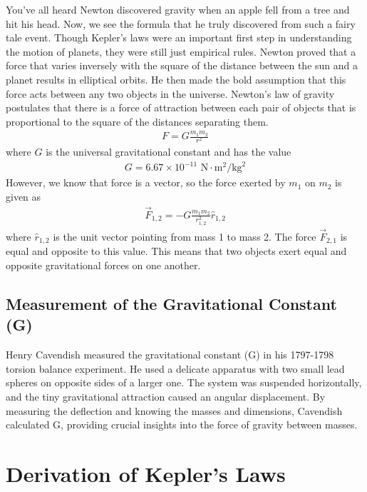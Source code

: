 \documentclass[11pt]{article}
\begin{document}
You've all heard Newton discovered gravity when an apple fell from a tree and hit his head. Now, we see the formula that he truly discovered from such a fairy tale event. Though Kepler's laws were an important first step in understanding the motion of planets, they were still just empirical rules. Newton proved that a force that varies inversely with the square of the distance between the sun and a planet results in elliptical orbits. He then made the bold assumption that this force acts between any two objects in the universe. Newton's law of gravity postulates that there is a force of attraction between each pair of objects that is proportional to the square of the distances separating them.
\begin{align*}
    F = G \frac{m_1 m_2}{r^2}
\end{align*}
where $G$ is the universal gravitational constant and has the value
\begin{align*}
    G = 6.67 \times 10^{-11} \text{ N}\cdot\text{m}^2 / \text{kg}^2
\end{align*}
However, we know that force is a vector, so the force exerted by $m_1$ on $m_2$ is given as
\begin{align*}
    \Vec{F}_{1,2} = -G\frac{m_1 m_2}{r^2_{1,2}}\hat{r}_{1,2}
\end{align*}
where $\hat{r}_{1,2}$ is the unit vector pointing from mass 1 to mass 2. The force $\Vec{F}_{2,1}$ is equal and opposite to this value. This means that two objects exert equal and opposite gravitational forces on one another. 

\subsection{Measurement of the Gravitational Constant (G)}

Henry Cavendish measured the gravitational constant (G) in his 1797-1798 torsion balance experiment. He used a delicate apparatus with two small lead spheres on opposite sides of a larger one. The system was suspended horizontally, and the tiny gravitational attraction caused an angular displacement. By measuring the deflection and knowing the masses and dimensions, Cavendish calculated G, providing crucial insights into the force of gravity between masses.

\section{Derivation of Kepler's Laws}
\end{document}
